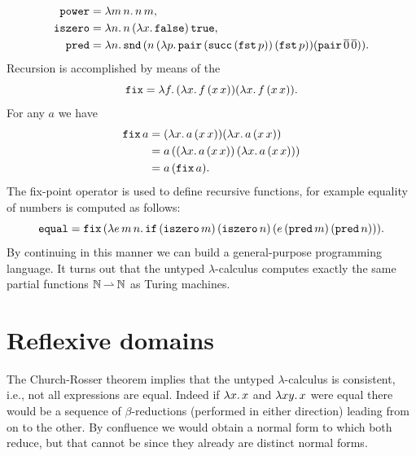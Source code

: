 %
\begin{align*}
  \mathtt{power} &= \lambda m\,n .\,n\,m,\\
  \mathtt{iszero} &= \lambda n .\,n\, (\lambda x .\,\mathtt{false})\, \mathtt{true},\\
  \mathtt{pred} &=
    \lambda n .\,
      \mathtt{snd}\, (n\, (\lambda p .\,
        \mathtt{pair}\, (\mathtt{succ}\, (\mathtt{fst}\, p))\,
        (\mathtt{fst}\, p))
      (\mathtt{pair}\, \overline{0}\, \overline{0})).
\end{align*}
%
Recursion is accomplished by means of the 
%
\begin{equation*}
  \mathtt{fix} = \lambda f .\,(\lambda x .\,f\,(x\,x)) (\lambda x .\,f\,(x\,x)).
\end{equation*}
%
For any $a$ we have
%
\begin{align*}
  \mathtt{fix}\,a &=
  (\lambda x .\,a\,(x\,x)) (\lambda x .\,a\,(x\,x)) \\
  &= a\,((\lambda x .\,a\,(x\,x))\,(\lambda x .\,a\,(x\,x))) \\
  &= a\,(\mathtt{fix}\,a).
\end{align*}
%
The fix-point operator is used to define recursive functions, for
example equality of numbers is computed as follows:
%
\begin{equation*}
  \mathtt{equal} = \mathtt{fix}\,(\lambda e\,m\,n .\,
    \mathtt{if}\,
    (\mathtt{iszero}\,m)\,
    (\mathtt{iszero}\,n)\,
    (e\,(\mathtt{pred}\,m)\,(\mathtt{pred}\,n))).
\end{equation*}
%
By continuing in this manner we can build a general-purpose programming language. It turns out that the untyped
$\lambda$-calculus computes exactly the same partial functions $\mathbb{N} \mathbin{\rightharpoonup} \mathbb{N}$ as Turing machines.


\section{Reflexive domains}
\label{sec:reflexive-domains}

The Church-Rosser theorem implies that the untyped $\lambda$-calculus
is consistent, i.e., not all expressions are equal. Indeed if $\lambda x .\,x$ and $\lambda x y .\,x$ were equal there would be a sequence of $\beta$-reductions (performed in either direction) leading from on to the other. By confluence we would obtain a normal form to which both reduce, but that cannot be since they already are distinct normal forms.

